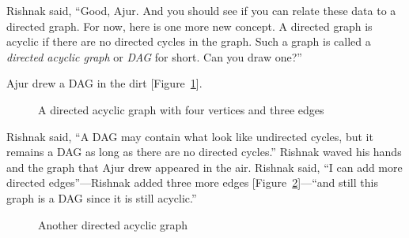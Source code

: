 
Rishnak said, ``Good, Ajur. And you should see if you can relate these data to a directed graph. For now, here is one more new concept. A directed graph is acyclic if there are no directed cycles in the graph. Such a graph is called a \textit{directed acyclic graph} or \textit{DAG} for short. Can you draw one?''

Ajur drew a DAG in the dirt [Figure~\ref{15g5}].

\begin{figure}
\begin{center}
\caption{A directed acyclic graph with four vertices and three edges}\label{15g5}
\end{center}
\end{figure}

Rishnak said, ``A DAG may contain what look like undirected cycles, but it remains a DAG as long as there are no directed cycles.''
Rishnak waved his hands and the graph that Ajur drew appeared in the air. Rishnak said, ``I can add more directed edges''---Rishnak added three more edges [Figure~\ref{15g6}]---``and still this graph is a DAG since it is still acyclic.''


\begin{figure}
\begin{center}
\caption{Another directed acyclic graph}\label{15g6}
\end{center}
\end{figure}

